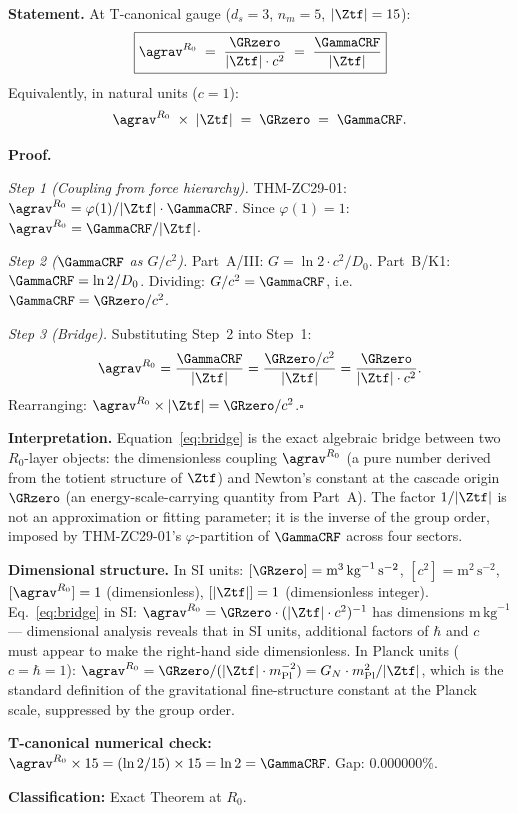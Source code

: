 \documentclass[12pt, a4paper]{article}
\begin{document}

\begin{formalbox}[title={THM-ZC75-01: Gravity Dimensional Bridge
  Theorem ($R_0$, Exact)}]

\textbf{Statement.}
At T-canonical gauge ($d_s = 3$, $n_m = 5$, $|\Ztf| = 15$):
\begin{equation}
  \boxed{
  \agrav^{R_0}
  \;=\; \frac{\GRzero}{|\Ztf| \cdot c^2}
  \;=\; \frac{\GammaCRF}{|\Ztf|}
  }
  \label{eq:bridge}
\end{equation}
Equivalently, in natural units ($c = 1$):
\[
  \agrav^{R_0} \;\times\; |\Ztf| \;=\; \GRzero \;=\; \GammaCRF.
\]

\textbf{Proof.}

\textit{Step 1 (Coupling from force hierarchy).}
THM-ZC29-01: $\agrav^{R_0} = \varphi(1)/|\Ztf| \cdot \GammaCRF$.
Since $\varphi(1) = 1$: $\agrav^{R_0} = \GammaCRF/|\Ztf|$.

\textit{Step 2 ($\GammaCRF$ as $G/c^2$).}
Part~A/III: $G = \ln2 \cdot c^2/D_0$.
Part~B/K1: $\GammaCRF = \ln2/D_0$.
Dividing: $G/c^2 = \GammaCRF$, i.e.\ $\GammaCRF = \GRzero/c^2$.

\textit{Step 3 (Bridge).}
Substituting Step~2 into Step~1:
\[
  \agrav^{R_0}
  = \frac{\GammaCRF}{|\Ztf|}
  = \frac{\GRzero/c^2}{|\Ztf|}
  = \frac{\GRzero}{|\Ztf| \cdot c^2}.
\]
Rearranging: $\agrav^{R_0} \times |\Ztf| = \GRzero/c^2$.\hfill$\square$

\textbf{Interpretation.}
Equation~\eqref{eq:bridge} is the exact algebraic bridge between
two $R_0$-layer objects:
the dimensionless coupling $\agrav^{R_0}$ (a pure number derived
from the totient structure of $\Ztf$) and
Newton's constant at the cascade origin $\GRzero$
(an energy-scale-carrying quantity from Part~A).
The factor $1/|\Ztf|$ is not an approximation or fitting parameter;
it is the inverse of the group order, imposed by THM-ZC29-01's
$\varphi$-partition of $\GammaCRF$ across four sectors.

\textbf{Dimensional structure.}
In SI units: $[\GRzero] = \text{m}^3\,\text{kg}^{-1}\,\text{s}^{-2}$,
$[c^2] = \text{m}^2\,\text{s}^{-2}$, $[\agrav^{R_0}] = 1$
(dimensionless), $[|\Ztf|] = 1$ (dimensionless integer).
Eq.~\eqref{eq:bridge} in SI:
$\agrav^{R_0} = \GRzero \cdot (|\Ztf| \cdot c^2)^{-1}$
has dimensions $\text{m}\,\text{kg}^{-1}$ --- dimensional
analysis reveals that in SI units, additional factors of
$\hbar$ and $c$ must appear to make the right-hand side
dimensionless. In Planck units ($c = \hbar = 1$):
$\agrav^{R_0} = \GRzero/(|\Ztf| \cdot m_{\rm Pl}^{-2})
= G_N \cdot m_{\rm Pl}^2 / |\Ztf|$,
which is the standard definition of the gravitational fine-structure
constant at the Planck scale, suppressed by the group order.

\textbf{T-canonical numerical check:}
$\agrav^{R_0} \times 15 = (\ln2/15) \times 15 = \ln2 = \GammaCRF$.
Gap: $0.000000\%$.

\textbf{Classification:} Exact Theorem at $R_0$.
\end{formalbox}
\end{document}
